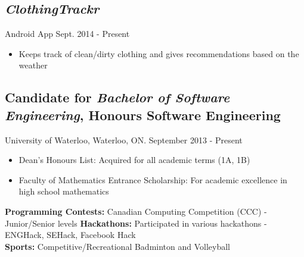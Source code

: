 \documentclass[10pt]{article}
\begin{document}
\begin{minipage}[t]{0.84\linewidth}
	\subsection*{\textit{ClothingTrackr}} \vspace{-6pt}
		Android App \hspace{275pt} Sept. 2014 - Present
		\begin{itemize}
			\item Keeps track of clean/dirty clothing and gives recommendations based on the weather
		\end{itemize}
	
	\subsection*{Candidate for \textit{Bachelor of Software Engineering}, Honours Software Engineering} 								\vspace{-6pt}
		University of Waterloo, Waterloo, ON. \hspace{105pt} September 2013 - Present
		\begin{itemize}
			\item Dean's Honours List: Acquired for all academic terms (1A, 1B)
			\item Faculty of Mathematics Entrance Scholarship: For academic excellence in high school mathematics \\
		\end{itemize}
\begin{flushleft}
\begin{small}
		\textbf{Programming Contests:} Canadian Computing Competition (CCC) - Junior/Senior levels
		\textbf{Hackathons:} Participated in various hackathons - ENGHack, SEHack, Facebook Hack\\
		\textbf{Sports:} Competitive/Recreational Badminton and Volleyball 
\end{small}
\end{flushleft}	
	
\end{minipage}
\end{document}
